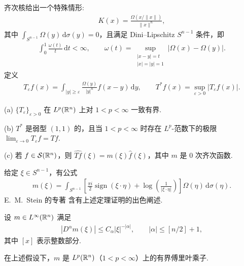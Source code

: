 齐次核给出一个特殊情形:
\begin{align*}
  K(x)=\frac{\Omega(x/\|x\|)}{\|x\|^{n}},
\end{align*}
其中 $\int_{S^{n-1}}\Omega(y)\,\mathrm{d}\sigma(y)=0$，且满足 Dini--Lipschitz $S^{n-1}$ 条件，即
\begin{align*}
  \int_{0}^{1}\frac{\omega(t)}{t}\,\mathrm{d}t<\infty,\qquad
  \omega(t)=\sup_{\substack{|x-y|=t\\ |x|=|y|=1}}|\Omega(x)-\Omega(y)|.
\end{align*}
定义
\begin{align*}
  T_{\varepsilon}f(x)=\int_{|y|\geq\varepsilon}\frac{\Omega(y)}{|y|^{n}}f(x-y)\,\mathrm{d}y,\qquad
  T^{*}f(x)=\sup_{\varepsilon>0}|T_{\varepsilon}f(x)|.
\end{align*}

\begin{theorem}\label{thm:4.6}
(a) $\{T_{\varepsilon}\}_{\varepsilon>0}$ 在 $L^{p}(\mathbb{R}^{n})$ 上对 $1<p<\infty$ 一致有界.

(b) $T^*$ 是弱型 $(1, 1)$ 的，且当 $1 < p < \infty$ 时存在 $L^p$-范数下的极限 $\lim_{\varepsilon \to 0} T_\varepsilon f = T f$.

(c) 若 $f \in \mathcal{S}(\mathbb{R}^n)$，则 $\widehat{Tf}(\xi) = m(\xi)\widehat{f}(\xi)$，其中 $m$ 是 $0$ 次齐次函数.
\end{theorem}

给定 $\xi \in S^{n-1}$，有公式
\begin{align*}
  m(\xi)=\int_{S^{n-1}}\left[\frac{\pi i}{2}\operatorname{sign}(\xi\cdot\eta)+\log\left(\frac{1}{|\xi\cdot\eta|}\right)\right]\Omega(\eta)\,\mathrm{d}\sigma(\eta).
\end{align*}
E.~M.~Stein 的专著 \cite{b96} 含有上述定理证明的出色阐述.

设 $m \in L^\infty(\mathbb{R}^n)$ 满足
\begin{align*}
  |D^{\alpha}m(\xi)|\leq C_{\alpha}|\xi|^{-|\alpha|},\qquad |\alpha|\leq[n/2]+1,
\end{align*}
其中 $[x]$ 表示整数部分.

\begin{theorem}\label{thm:4.7}
在上述假设下，$m$ 是 $L^p(\mathbb{R}^n)$（$1 < p < \infty$）上的有界傅里叶乘子.
\end{theorem}


